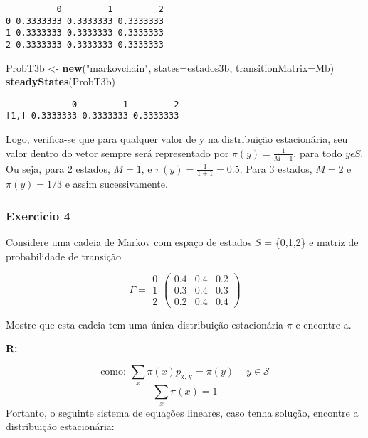 \documentclass[
]{article}
\newenvironment{Shaded}{\begin{snugshade}}{\end{snugshade}}
\newcommand{\DataTypeTok}[1]{\textcolor[rgb]{0.13,0.29,0.53}{#1}}
\newcommand{\KeywordTok}[1]{\textcolor[rgb]{0.13,0.29,0.53}{\textbf{#1}}}
\newcommand{\NormalTok}[1]{#1}
\newcommand{\StringTok}[1]{\textcolor[rgb]{0.31,0.60,0.02}{#1}}
\begin{document}
\begin{verbatim}
          0         1         2
0 0.3333333 0.3333333 0.3333333
1 0.3333333 0.3333333 0.3333333
2 0.3333333 0.3333333 0.3333333
\end{verbatim}

\begin{Shaded}
\begin{Highlighting}[]
\NormalTok{ProbT3b <-}\StringTok{ }\KeywordTok{new}\NormalTok{(}\StringTok{"markovchain"}\NormalTok{, }\DataTypeTok{states=}\NormalTok{estados3b, }\DataTypeTok{transitionMatrix=}\NormalTok{Mb)}
\KeywordTok{steadyStates}\NormalTok{(ProbT3b)}
\end{Highlighting}
\end{Shaded}

\begin{verbatim}
             0         1         2
[1,] 0.3333333 0.3333333 0.3333333
\end{verbatim}

Logo, verifica-se que para qualquer valor de y na distribuição
estacionária, seu valor dentro do vetor sempre será representado por
\(\pi(y) = \frac{1}{M+1}\), para todo \(y\epsilon S\). Ou seja, para 2
estados, \(M = 1\), e \(\pi(y)=\frac{1}{1+1}=0.5\). Para 3 estados,
\(M = 2\) e \(\pi(y) = 1/3\) e assim sucessivamente.

\pagebreak

\hypertarget{exercicio-4}{%
\subsubsection{Exercicio 4}\label{exercicio-4}}

Considere uma cadeia de Markov com espaço de estados \(S\) = \{0,1,2\} e
matriz de probabilidade de transição

\[\Gamma = 
\begin{matrix}
0\\ 
1\\ 
2
\end{matrix}
\begin{pmatrix}
0.4 & 0.4 & 0.2  \\
0.3 & 0.4 & 0.3  \\
0.2 & 0.4 & 0.4  
\end{pmatrix}\]

Mostre que esta cadeia tem uma única distribuição estacionária \(\pi\) e
encontre-a.

\textbf{R:}

\[\text{como: } \sum_{x}\pi(x)p_{\text{x, y}} = \pi{(y)}\ \quad y \in \mathcal{S} \]
\[\sum_{x}{\pi(x)} = 1 \] Portanto, o seguinte sistema de equações
lineares, caso tenha solução, encontre a distribuição estacionária:
\end{document}
